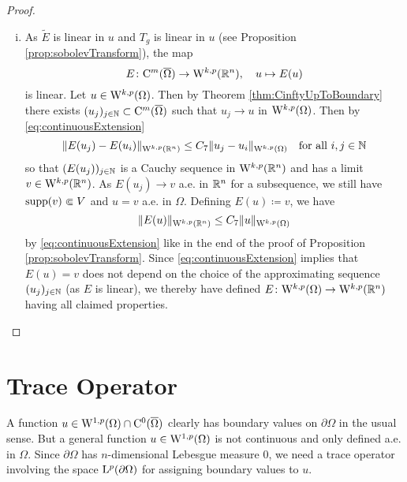 \begin{proof}
\begin{enumerate}[i)]
      \item As $\tilde E$ is linear in $u$ and $T_g$ is linear in $u$ (see Proposition \ref{prop:sobolevTransform}), the map
        $$
        E \colon \mathrm{C}^m(\overline\Omega) \to \mathrm{W}^{k,p}(\mathbb{R}^n), \quad u \mapsto E(u)
        $$
        is linear.
        Let $u \in \mathrm{W}^{k,p}(\Omega)$.
        Then by Theorem \ref{thm:CinftyUpToBoundary} there exists $(u_j)_{j\in \mathbb{N}} \subset \mathrm{C}^m(\overline\Omega)$ such that $u_j \to u$ in $\mathrm{W}^{k,p}(\Omega)$.
        Then by \eqref{eq:continuousExtension}
        $$
        \|E(u_j) - E(u_i) \|_{\mathrm{W}^{k,p}(\mathbb{R}^n)} \leq C_7 \|u_j - u_i \|_{\mathrm{W}^{k,p}(\Omega)} \quad\text{for all } i,j \in \mathbb{N}
        $$
        so that $(E(u_j))_{j \in \mathbb{N}}$ is a Cauchy sequence in $\mathrm{W}^{k,p}(\mathbb{R}^n)$ and has a limit $v \in \mathrm{W}^{k,p}(\mathbb{R}^n)$.
        As $E(u_j) \to v$ a.e. in $\mathbb{R}^n$ for a subsequence, we still have $\operatorname{supp}(v) \Subset V$ and $u = v$ a.e. in $\Omega$.
        Defining $E(u) \coloneqq v$, we have
        $$
        \|E(u)\|_{\mathrm{W}^{k,p}(\mathbb{R}^n)} \leq C_7 \|u\|_{\mathrm{W}^{k,p}(\Omega)}
        $$
        by \eqref{eq:continuousExtension} like in the end of the proof of Proposition \ref{prop:sobolevTransform}. 
        Since \eqref{eq:continuousExtension} implies that $E(u) = v$ does not depend on the choice of the approximating sequence $(u_j)_{j \in \mathbb{N}}$ (as $E$ is linear), we thereby have defined $E \colon \mathrm{W}^{k,p}(\Omega) \to \mathrm{W}^{k,p}(\mathbb{R}^n)$ having all claimed properties. \qedhere
  \end{enumerate}
\end{proof}

\section{Trace Operator}

A function $u \in \mathrm{W}^{1,p}(\Omega) \cap \mathrm{C}^0(\overline\Omega)$ clearly has boundary values on $\partial\Omega$ in the usual sense.
But a general function $u \in \mathrm{W}^{1,p}(\Omega)$ is not continuous and only defined a.e. in $\Omega$. 
Since $\partial\Omega$ has $n$-dimensional Lebesgue measure $0$, we need a trace operator involving the space $\mathrm{L}^p(\partial\Omega)$ for assigning boundary values to $u$.

